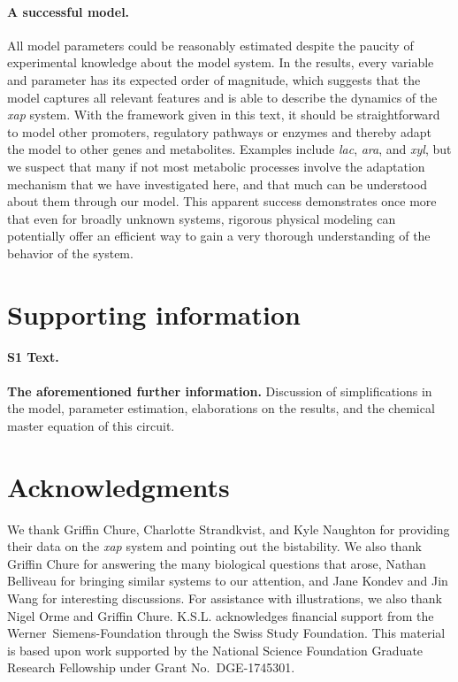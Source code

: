 \documentclass[10pt,letterpaper]{article}
\begin{document}
\paragraph*{A successful model.}
All model parameters could be reasonably estimated despite the paucity of
experimental knowledge about the model system. In the results, every
variable and parameter 
has its expected order of magnitude, which suggests
that the model captures all relevant features and is able to describe the
dynamics of the \emph{xap} system. With the framework given in this text, it
should be straightforward to model other promoters, regulatory pathways or
enzymes and thereby adapt the model to other genes and metabolites. Examples
include \emph{lac}, \emph{ara}, and \emph{xyl}, but we suspect that many if
not most metabolic processes involve the adaptation mechanism that we have
investigated here, and that much can be understood about them through our
model. This apparent success demonstrates once more that even for broadly
unknown systems, rigorous physical modeling can potentially offer an
efficient way to gain a very thorough understanding of the behavior of the
system. 



\section*{Supporting information}
\paragraph*{S1 Text.}
\label{S1_Text}
{\bf The aforementioned further information.} Discussion of simplifications
in the model, parameter estimation, elaborations on the results, and the
chemical master equation of this circuit.

\section*{Acknowledgments}
We thank Griffin Chure, Charlotte Strandkvist, and Kyle Naughton for
providing their data on the \emph{xap} system and pointing out the
bistability. We also thank Griffin Chure for answering the many biological
questions that arose, Nathan Belliveau for bringing similar systems to our
attention, and Jane Kondev and Jin Wang for interesting discussions.
For assistance with illustrations, we also thank Nigel Orme and Griffin Chure.
K.S.L. acknowledges financial support from the
Werner~Siemens-Foundation through the Swiss Study Foundation.
This material is based upon work supported by the National Science Foundation
Graduate Research Fellowship under Grant No.\ DGE-1745301.
\end{document}
